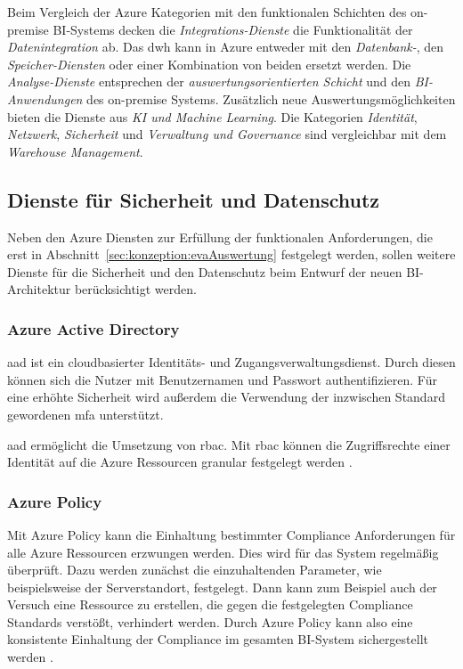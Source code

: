 Beim Vergleich der Azure Kategorien mit den funktionalen Schichten des on-premise BI-Systems decken die \textit{Integrations-Dienste} die Funktionalität der \textit{Datenintegration} ab. Das \ac{dwh} kann in Azure entweder mit den \textit{Datenbank-}, den \textit{Speicher-Diensten} oder einer Kombination von beiden ersetzt werden. Die \textit{Analyse-Dienste} entsprechen der \textit{auswertungsorientierten Schicht} und den \textit{BI-Anwendungen} des on-premise Systems. Zusätzlich neue Auswertungsmöglichkeiten bieten die Dienste aus \textit{KI und Machine Learning}. Die Kategorien \textit{Identität}, \textit{Netzwerk}, \textit{Sicherheit} und \textit{Verwaltung und Governance} sind vergleichbar mit dem \textit{Warehouse Management}.

\subsection{Dienste für Sicherheit und Datenschutz} \label{subsec:grundlagen:azure:sicherheitUndDatenschutz}
Neben den Azure Diensten zur Erfüllung der funktionalen Anforderungen, die erst in Abschnitt~\ref{sec:konzeption:evaAuswertung} festgelegt werden, sollen weitere Dienste für die Sicherheit und den Datenschutz beim Entwurf der neuen BI-Architektur berücksichtigt werden.

\subsubsection{Azure Active Directory} \label{subsec:grundlagen:azure:sicherheitUndDatenschutz:aad}
\ac{aad} ist ein cloudbasierter Identitäts- und Zugangsverwaltungsdienst. Durch diesen können sich die Nutzer mit Benutzernamen und Passwort authentifizieren. Für eine erhöhte Sicherheit wird außerdem die Verwendung der inzwischen Standard gewordenen \ac{mfa} unterstützt.

\ac{aad} ermöglicht die Umsetzung von \ac{rbac}. Mit \ac{rbac} können die Zugriffsrechte einer Identität auf die Azure Ressourcen granular festgelegt werden \cite{stefanovic_azure_2021}.

\subsubsection{Azure Policy} \label{subsec:grundlagen:azure:sicherheitUndDatenschutz:ap}
Mit Azure Policy kann die Einhaltung bestimmter Compliance Anforderungen für alle Azure Ressourcen erzwungen werden. Dies wird für das System regelmäßig überprüft. Dazu werden zunächst die einzuhaltenden Parameter, wie beispielsweise der Serverstandort, festgelegt. Dann kann zum Beispiel auch der Versuch eine Ressource zu erstellen, die gegen die festgelegten Compliance Standards verstößt, verhindert werden. Durch Azure Policy kann also eine konsistente Einhaltung der Compliance im gesamten BI-System sichergestellt werden \cite{stefanovic_azure_2021}.

